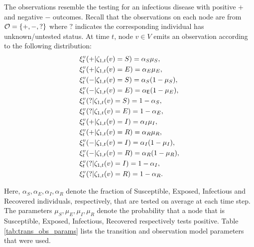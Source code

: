 The observations resemble the testing for an infectious disease with positive $+$ and negative $-$ outcomes. Recall that the observations on each node are from $\mathcal{O} = \{+, -, ?\}$ where $?$ indicates the corresponding individual has unknown/untested status. At time $t$, node $v \in V$ emits an observation according to the following distribution:
\begin{equation}
\begin{split}
    & \xi_t^{v}(+ | \zeta_{1, t}(v) = S) = \alpha_S \mu_S, \\
    & \xi_t^{v}(+ | \zeta_{1, t}(v) = E) = \alpha_E \mu_E, \\
    & \xi_t^{v}(- | \zeta_{1, t}(v) = S) = \alpha_S (1 - \mu_S), \\
    &\xi_t^{v}(- | \zeta_{1, t}(v) = E) = \alpha_{\mathsf{E}} (1-\mu_E), \\
    & \xi_t^{v}(? | \zeta_{1, t}(v) = S) = 1 - \alpha_S, \\
    &\xi_t^{v}(? | \zeta_{1, t}(v) = E) = 1 - \alpha_E, \\
    & \xi_t^{v}(+ | \zeta_{1, t}(v) = I) = \alpha_I \mu_I, \\
    &\xi_t^{v}(+ | \zeta_{1, t}(v) = R) = \alpha_R \mu_R, \\
    & \xi_t^{v}(- | \zeta_{1, t}(v) = I) = \alpha_I (1-\mu_I), \\ 
    &\xi_t^{v}(- | \zeta_{1, t}(v) = R) = \alpha_R (1 - \mu_R), \\
    & \xi_t^{v}(? | \zeta_{1, t}(v) = I) = 1 - \alpha_I, \\
    & \xi_t^{v}(? | \zeta_{1, t}(v) = R) = 1 - \alpha_R.
\end{split}
\label{eqn:SEIRS_obs}
\end{equation}

Here, $\alpha_S, \alpha_E, \alpha_I, \alpha_R$ denote the fraction of Susceptible, Exposed, Infectious and Recovered individuals, respectively, that are tested on average at each time step. The parameters $\mu_S, \mu_E, \mu_I, \mu_R$ denote the probability that a node that is Susceptible, Exposed, Infectious, Recovered respectively tests positive.
Table \ref{tab:trans_obs_params} lists the transition and observation model parameters that were used.

